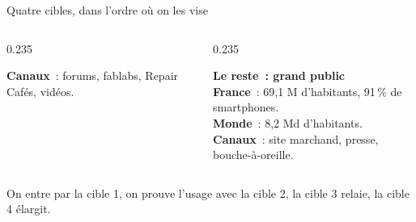 \begin{frame}{Quatre cibles, dans l'ordre où on les vise}
\begin{columns}[T]
\begin{column}{0.235\textwidth}
\begin{carte}[height=4.55cm,valign=top,title={3 · Relais d'opinion},colbacktitle=mkC,coltitle=white,fonttitle=\sffamily\bfseries\scriptsize]
        {\bfseries\color{insarouge}Canaux}~: forums, fablabs, Repair Cafés, vidéos.
      \end{carte}
    \end{column}
    \begin{column}{0.235\textwidth}
      \begin{carte}[height=4.55cm,valign=top,title={4 · Extension},colbacktitle=mkD,coltitle=black,fonttitle=\sffamily\bfseries\scriptsize]
        \raggedright{\sffamily\bfseries\footnotesize Le reste~: grand public}\\[3pt]
        \scriptsize\textbf{France}~: 69,1 M d'habitants, 91\,\% de smartphones.\\[2pt]
        \textbf{Monde}~: 8,2 Md d'habitants.\\[3pt]
        {\bfseries\color{insarouge}Canaux}~: site marchand, presse, bouche-à-oreille.
      \end{carte}
    \end{column}
  \end{columns}
  \vspace{0.08cm}
  \begin{pcompact}\centering\footnotesize
    On entre par la cible 1, on prouve l'usage avec la cible 2, la cible 3 relaie, la cible 4 élargit.
  \end{pcompact}
\end{frame}

